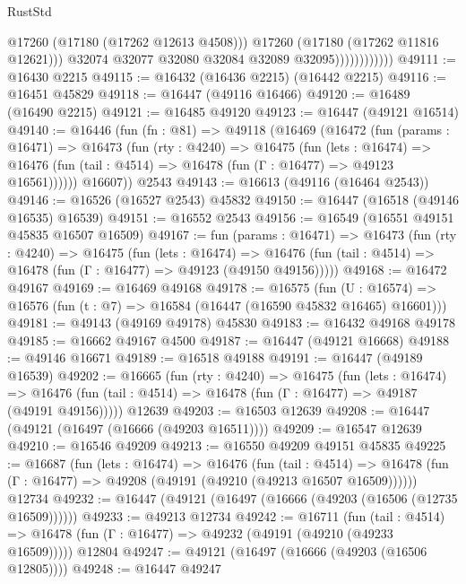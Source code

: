 \begin{lexlean}{RustStd}
\begin{coremodule}
{\begin{coremodule}
{{{{{{{{{{{{{{{{{{{{{{{{{{{{{{{{{{{{{{{{{{{{{{{{{{{{{{{                                @17260
                                (@17180 (@17262 @12613 @4508)))
                              @17260
                              (@17180 (@17262 @11816 @12621)))
                            @32074
                            @32077
                            @32080
                            @32084
                            @32089
                            @32095))))))))))))
@49111 := @16430 @2215
@49115 := @16432 (@16436 @2215) (@16442 @2215)
@49116 := @16451 @45829
@49118 := @16447 (@49116 @16466)
@49120 := @16489 (@16490 @2215)
@49121 := @16485 @49120
@49123 := @16447 (@49121 @16514)
@49140 := @16446
    (fun (fn : @81) =>
    @49118
      (@16469
        (@16472
          (fun (params : @16471) =>
          @16473
            (fun (rty : @4240) =>
            @16475
              (fun (lets : @16474) =>
              @16476 (fun (tail : @4514) => @16478 (fun (Γ : @16477) => @49123 @16561))))))
        @16607))
    @2543
@49143 := @16613 (@49116 (@16464 @2543))
@49146 := @16526 (@16527 @2543) @45832
@49150 := @16447 (@16518 (@49146 @16535) @16539)
@49151 := @16552 @2543
@49156 := @16549 (@16551 @49151 @45835 @16507 @16509)
@49167 := fun (params : @16471) =>
  @16473
    (fun (rty : @4240) =>
    @16475
      (fun (lets : @16474) =>
      @16476 (fun (tail : @4514) => @16478 (fun (Γ : @16477) => @49123 (@49150 @49156)))))
@49168 := @16472 @49167
@49169 := @16469 @49168
@49178 := @16575
    (fun (U : @16574) => @16576 (fun (t : @7) => @16584 (@16447 (@16590 @45832 @16465) @16601)))
@49181 := @49143 (@49169 @49178) @45830
@49183 := @16432 @49168 @49178
@49185 := @16662 @49167 @4500
@49187 := @16447 (@49121 @16668)
@49188 := @49146 @16671
@49189 := @16518 @49188
@49191 := @16447 (@49189 @16539)
@49202 := @16665
    (fun (rty : @4240) =>
    @16475
      (fun (lets : @16474) =>
      @16476 (fun (tail : @4514) => @16478 (fun (Γ : @16477) => @49187 (@49191 @49156)))))
    @12639
@49203 := @16503 @12639
@49208 := @16447 (@49121 (@16497 (@16666 (@49203 @16511))))
@49209 := @16547 @12639
@49210 := @16546 @49209
@49213 := @16550 @49209 @49151 @45835
@49225 := @16687
    (fun (lets : @16474) =>
    @16476
      (fun (tail : @4514) =>
      @16478 (fun (Γ : @16477) => @49208 (@49191 (@49210 (@49213 @16507 @16509))))))
    @12734
@49232 := @16447 (@49121 (@16497 (@16666 (@49203 (@16506 (@12735 @16509))))))
@49233 := @49213 @12734
@49242 := @16711
    (fun (tail : @4514) => @16478 (fun (Γ : @16477) => @49232 (@49191 (@49210 (@49233 @16509)))))
    @12804
@49247 := @49121 (@16497 (@16666 (@49203 (@16506 @12805))))
@49248 := @16447 @49247
}}}}}}}}}}}}}}}}}}}}}}}}}}}}}}}}}}}}}}}}}}}}}}}}}}}}}}}
\end{coremodule}}
\end{coremodule}
\end{lexlean}
